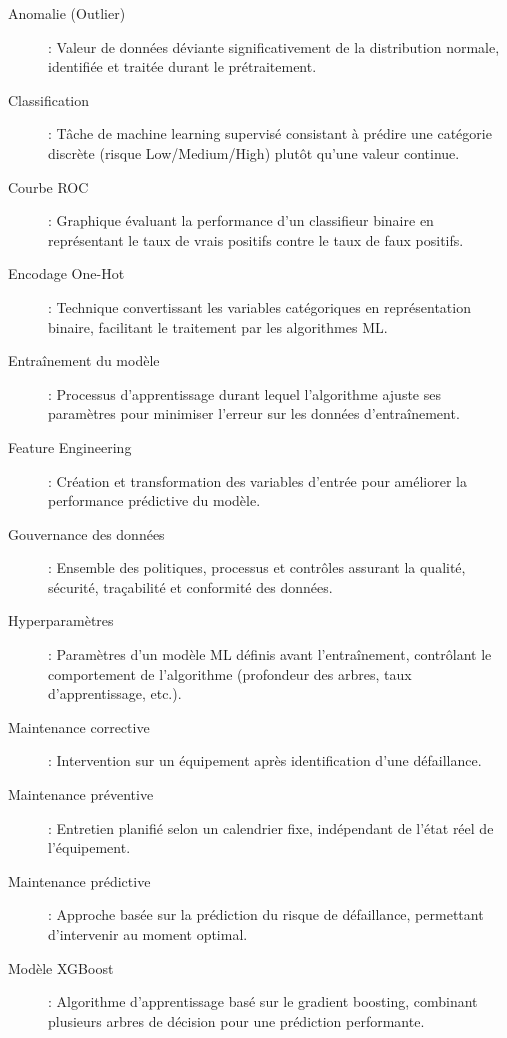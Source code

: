 \documentclass[a4paper,12pt,twoside]{report}
\begin{document}
\begin{description}
\item[Anomalie (Outlier)] : Valeur de données déviante significativement de la distribution normale, identifiée et traitée durant le prétraitement.

\item[Classification] : Tâche de machine learning supervisé consistant à prédire une catégorie discrète (risque Low/Medium/High) plutôt qu'une valeur continue.

\item[Courbe ROC] : Graphique évaluant la performance d'un classifieur binaire en représentant le taux de vrais positifs contre le taux de faux positifs.

\item[Encodage One-Hot] : Technique convertissant les variables catégoriques en représentation binaire, facilitant le traitement par les algorithmes ML.

\item[Entraînement du modèle] : Processus d'apprentissage durant lequel l'algorithme ajuste ses paramètres pour minimiser l'erreur sur les données d'entraînement.

\item[Feature Engineering] : Création et transformation des variables d'entrée pour améliorer la performance prédictive du modèle.

\item[Gouvernance des données] : Ensemble des politiques, processus et contrôles assurant la qualité, sécurité, traçabilité et conformité des données.

\item[Hyperparamètres] : Paramètres d'un modèle ML définis avant l'entraînement, contrôlant le comportement de l'algorithme (profondeur des arbres, taux d'apprentissage, etc.).

\item[Maintenance corrective] : Intervention sur un équipement après identification d'une défaillance.

\item[Maintenance préventive] : Entretien planifié selon un calendrier fixe, indépendant de l'état réel de l'équipement.

\item[Maintenance prédictive] : Approche basée sur la prédiction du risque de défaillance, permettant d'intervenir au moment optimal.

\item[Modèle XGBoost] : Algorithme d'apprentissage basé sur le gradient boosting, combinant plusieurs arbres de décision pour une prédiction performante.


\end{description}
\end{document}

